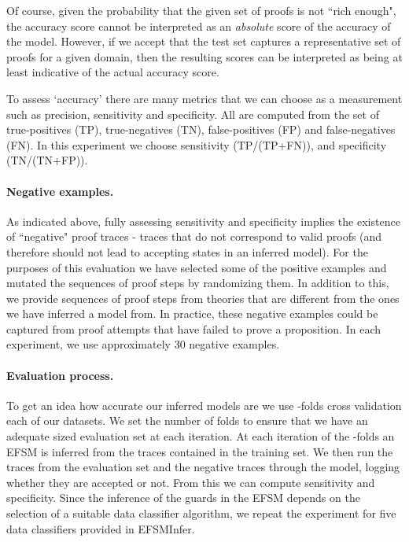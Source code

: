 \documentclass{llncs}
\begin{document}
Of course, given the probability that the given set of proofs is not ``rich enough", the accuracy score cannot be interpreted as an \emph{absolute} score of the accuracy of the model. However, if we accept that the test set captures a representative set of proofs for a given domain, then the resulting scores can be interpreted as being at least indicative of the actual accuracy score.

To assess `accuracy' there are many metrics that we can choose as a measurement such as precision, sensitivity and specificity. All are computed from the set of true-positives (TP), true-negatives (TN), false-positives (FP) and false-negatives (FN). In this experiment we choose sensitivity (TP/(TP+FN)), and specificity (TN/(TN+FP)).

\paragraph{Negative examples.} As indicated above, fully assessing sensitivity and specificity implies the existence of ``negative" proof traces - traces that do not correspond to valid proofs (and therefore should not lead to accepting states in an inferred model). For the purposes of this evaluation we have selected some of the positive examples and mutated the sequences of proof steps by randomizing them. In addition to this, we provide sequences of proof steps from theories that are different from the ones we have inferred a model from. In practice, these negative examples could be captured from proof attempts that have failed to prove a proposition. In each experiment, we use approximately 30 negative examples.

\paragraph{Evaluation process.} To get an idea how accurate our inferred models are we use -folds cross validation each of our datasets. We set the number of folds  to ensure that we have an adequate sized evaluation set at each iteration. At each iteration of the -folds an EFSM is inferred from the traces contained in the training set. We then run the traces from the evaluation set and the negative traces through the model, logging whether they are accepted or not. From this we can compute sensitivity and specificity. Since the inference of the guards in the EFSM depends on the selection of a suitable data classifier algorithm, we repeat the experiment for five data classifiers provided in EFSMInfer.
\end{document}
